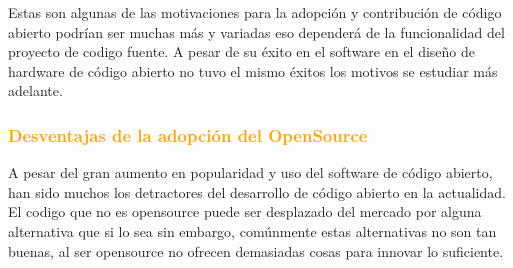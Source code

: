  Estas son algunas de las motivaciones para la adopción y contribución de código abierto podrían ser muchas más y variadas eso dependerá de la funcionalidad del proyecto de codigo fuente. A pesar de su éxito en el software en el diseño de hardware de código abierto  no tuvo el mismo éxitos los motivos se estudiar más adelante.

\subsubsection{\textcolor{orange}{Desventajas de la adopción del OpenSource}}

A pesar del gran aumento en popularidad y uso del software de código abierto, han sido muchos los detractores del desarrollo de código abierto en la actualidad. 
El codigo que no es opensource puede ser desplazado del mercado por alguna alternativa que si lo sea sin embargo, comúnmente estas alternativas no son tan buenas, al ser opensource no ofrecen demasiadas cosas para innovar lo suficiente.

